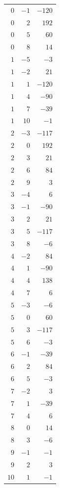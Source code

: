 \begin{longtable}{rrr}
$0$ & $-1$ & $-120$ \\
$0$ & $2$ & $192$ \\
$0$ & $5$ & $60$ \\
$0$ & $8$ & $14$ \\
$1$ & $-5$ & $-3$ \\
$1$ & $-2$ & $21$ \\
$1$ & $1$ & $-120$ \\
$1$ & $4$ & $-90$ \\
$1$ & $7$ & $-39$ \\
$1$ & $10$ & $-1$ \\
$2$ & $-3$ & $-117$ \\
$2$ & $0$ & $192$ \\
$2$ & $3$ & $21$ \\
$2$ & $6$ & $84$ \\
$2$ & $9$ & $3$ \\
$3$ & $-4$ & $6$ \\
$3$ & $-1$ & $-90$ \\
$3$ & $2$ & $21$ \\
$3$ & $5$ & $-117$ \\
$3$ & $8$ & $-6$ \\
$4$ & $-2$ & $84$ \\
$4$ & $1$ & $-90$ \\
$4$ & $4$ & $138$ \\
$4$ & $7$ & $6$ \\
$5$ & $-3$ & $-6$ \\
$5$ & $0$ & $60$ \\
$5$ & $3$ & $-117$ \\
$5$ & $6$ & $-3$ \\
$6$ & $-1$ & $-39$ \\
$6$ & $2$ & $84$ \\
$6$ & $5$ & $-3$ \\
$7$ & $-2$ & $3$ \\
$7$ & $1$ & $-39$ \\
$7$ & $4$ & $6$ \\
$8$ & $0$ & $14$ \\
$8$ & $3$ & $-6$ \\
$9$ & $-1$ & $-1$ \\
$9$ & $2$ & $3$ \\
$10$ & $1$ & $-1$ \\
\end{longtable}
